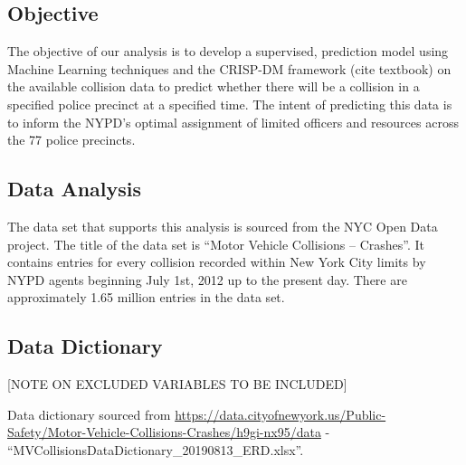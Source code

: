 \hypertarget{objective}{%
\subsection{Objective}\label{objective}}

The objective of our analysis is to develop a supervised, prediction
model using Machine Learning techniques and the CRISP-DM framework (cite
textbook) on the available collision data to predict whether there will
be a collision in a specified police precinct at a specified time. The
intent of predicting this data is to inform the NYPD's optimal
assignment of limited officers and resources across the 77 police
precincts.

\hypertarget{data-analysis}{%
\subsection{Data Analysis}\label{data-analysis}}

The data set that supports this analysis is sourced from the NYC Open
Data project. The title of the data set is ``Motor Vehicle Collisions --
Crashes''. It contains entries for every collision recorded within New
York City limits by NYPD agents beginning July 1st, 2012 up to the
present day. There are approximately 1.65 million entries in the data
set.

\hypertarget{data-dictionary}{%
\subsection{Data Dictionary}\label{data-dictionary}}

{[}NOTE ON EXCLUDED VARIABLES TO BE INCLUDED{]}

Data dictionary sourced from
\url{https://data.cityofnewyork.us/Public-Safety/Motor-Vehicle-Collisions-Crashes/h9gi-nx95/data}
- ``MVCollisionsDataDictionary\_20190813\_ERD.xlsx''.

